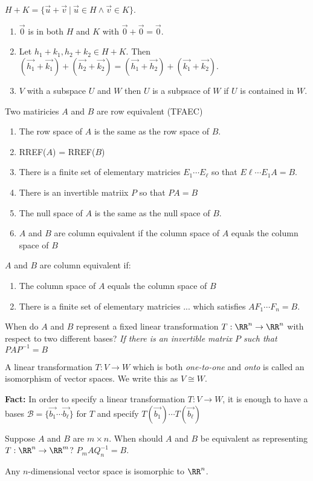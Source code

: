 $H+K=\{\vec{u}+\vec{v}\ |\ \vec{u}\in H \wedge \vec{v}\in K\}$. 
\begin{enumerate}
\item $\vec{0}$ is in both $H$ and $K$ with $\vec{0}+\vec{0}=\vec{0}$.
\item Let $h_1+k_1,h_2+k_2\in H+K$. Then $(\vec{h_1}+\vec{k_1})+(\vec{h_2}+\vec{k_2}) = (\vec{h_1}+\vec{h_2})+(\vec{k_1}+\vec{k_2})$.
\item $V$ with a subspace $U$ and $W$ then $U$ is a subpsace of $W$ if $U$ is contained in $W$.
\end{enumerate}
Two matiricies $A$ and $B$ are row equivalent (TFAEC)
\begin{enumerate}
\item The row space of $A$ is the same as the row space of $B$.
\item RREF($A$) = RREF($B$)
\item There is a finite set of elementary matricies $E_1\cdots E_\ell$ so that $E\ell \cdots E_1 A = B$.
\item There is an invertible matriix $P$ so that $PA=B$
\item The null space of $A$ is the same as the null space of $B$.
\item $A$ and $B$ are column equivalent if the column space of $A$ equals the column space of $B$
\end{enumerate}
$A$ and $B$ are column equivalent if:
\begin{enumerate}
\item The column space of $A$ equals the column space of $B$
\item There is a finite set of elementary matricies ... which satisfies $AF_1\cdots F_n=B$.
\end{enumerate}
When do $A$ and $B$ represent a fixed linear transformation $T:\RR^n\to\RR^n$ with respect to two different bases? \emph{If there is an invertible matrix $P$ such that $PAP^{-1}=B$}
\begin{definition}
\label{iso}
A linear transformation $T:V\to W$ which is both \emph{one-to-one} and \emph{onto} is called an isomorphism of vector spaces. We write this as $V\cong W$.
\end{definition}
\textbf{Fact:} In order to specify a linear transformation $T:V\to W$, it is enough to have a bases $\mathcal{B} = \{ \vec{b_1} \cdots \vec{b_\ell} \}$ for $T$ and specify $T(\vec{b_1})\cdots T(\vec{b_\ell})$

Suppose $A$ and $B$ are $m\times n$. When should $A$ and $B$ be equivalent as representing $T:\RR^n\to\RR^m$? $P_mAQ_n^{-1}=B$.
\begin{definition}
Any $n$-dimensional vector space is isomorphic to $\RR^n$.
\end{definition}


